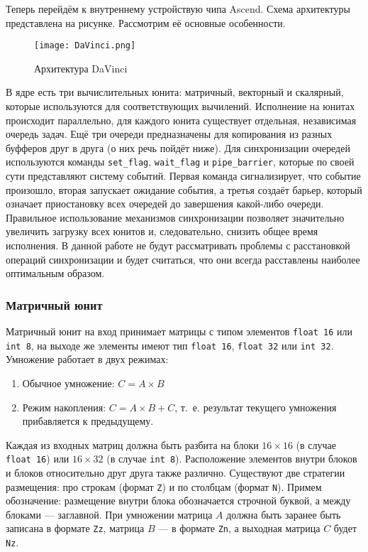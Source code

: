 Теперь перейдём к внутреннему устройствую чипа Ascend. Схема архитектуры
представлена на рисунке. Рассмотрим её основные особенности.

\begin{figure}[h!]
    \centering
    \texttt{[image: DaVinci.png]}
    \caption{Архитектура DaVinci}
\end{figure}

В ядре есть три вычислительных юнита: матричный, векторный и скалярный,
которые используются для соответствующих вычилений.  Исполнение на юнитах
происходит параллельно, для каждого юнита существует
отдельная, независимая очередь задач. Ещё три очереди предназначены для
копирования из разных буфферов друг в друга (о них речь пойдёт ниже).
Для синхронизации очередей используются команды \texttt{set\_flag},
\texttt{wait\_flag} и \texttt{pipe\_barrier}, которые по своей сути представляют
систему событий. Первая команда сигнализирует, что событие произошло, вторая
запускает ожидание события, а третья создаёт барьер, который означает
приостановку всех очередей до завершения какой-либо очереди. Правильное
использование механизмов синхронизации позволяет значительно увеличить
загрузку всех юнитов и, следовательно, снизить общее время исполнения.
В данной работе не будут рассматривать проблемы с расстановкой операций
синхронизации и будет считаться, что они всегда расставлены наиболее
оптимальным образом.

\subsubsection{Матричный юнит}

Матричный юнит на вход принимает матрицы с типом элементов \texttt{float 16}
или \texttt{int 8}, на выходе же элементы имеют тип \texttt{float 16},
\texttt{float 32} или \texttt{int 32}. Умножение работает в двух режимах:

\begin{enumerate}
    \item Обычное умножение: $C = A \times B$
    \item Режим накопления: $C = A \times B + C$, т.~е. результат текущего
          умножения прибавляется к предыдущему.
\end{enumerate}

Каждая из входных матриц должна быть разбита на блоки $16 \times 16$
(в случае \texttt{float 16}) или $16 \times 32$ (в случае \texttt{int 8}).
Расположение элементов внутри блоков и блоков относительно друг друга также
различно. Существуют две стратегии размещения: про строкам (формат \texttt{Z})
и по столбцам (формат \texttt{N}). Примем обозначение: размещение внутри блока
обозначается строчной буквой, а между блоками --- заглавной. При умножении
матрица $A$ должна быть заранее быть записана в формате \texttt{Zz},
матрица $B$ --- в формате \texttt{Zn}, а выходная матрица $C$ будет \texttt{Nz}.

